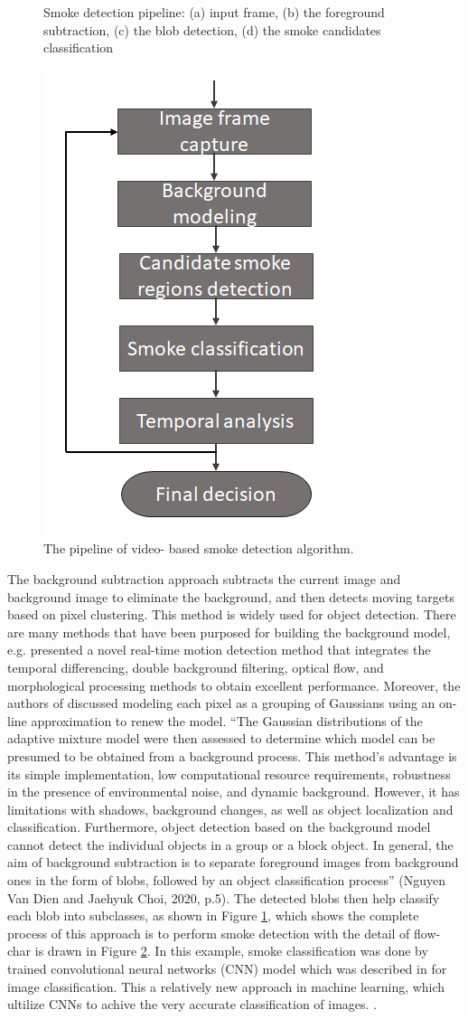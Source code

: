 \begin{figure}
{}
\caption{Smoke detection pipeline: (a) input frame, (b) the foreground subtraction, (c) the blob detection, (d) the smoke candidates classification }
\label{fig:bgmethod}
\end{figure}
\begin{figure}
\centering
 \includegraphics[width=0.3\linewidth]{Figures/smoke.jpg}
 \caption{The pipeline of video- based smoke detection algorithm.}
 \label{fig:smoke}
\end{figure}
The background subtraction approach \cite{lee2012adaptive}\cite{stauffer1999adaptive} subtracts the current image and background image to eliminate the background, and then detects moving targets based on pixel clustering. This method is widely used for object detection. There are many methods that have been purposed for building the background model, e.g.  \cite{lu2008improved} presented a novel real-time motion detection method that integrates the temporal differencing, double background filtering, optical flow, and morphological processing methods to obtain excellent performance. Moreover, the authors of \cite{stauffer1999adaptive} discussed modeling each pixel as a grouping of Gaussians using an on-line approximation to renew the model. “The Gaussian distributions of the adaptive mixture model were then assessed to determine which model can be presumed to be obtained from a background process. This method’s advantage is its simple implementation, low computational resource requirements, robustness in the presence of environmental noise, and dynamic background. However, it has limitations with shadows, background changes, as well as object localization and classification. Furthermore, object detection based on the background model cannot detect the individual objects in a group or a block object. In general, the aim of background subtraction is to separate foreground images from background ones in the form of blobs, followed by an object classification process” (Nguyen Van Dien and Jaehyuk Choi, 2020, p.5). The detected blobs then help classify each blob into subclasses, as shown in Figure \ref{fig:bgmethod}, which shows the complete process of this approach is to perform smoke detection with the detail of flow-char is drawn in Figure \ref{fig:smoke}. In this example, smoke classification was done by trained convolutional neural networks (CNN) model which was described in \cite{krizhevsky2017imagenet} for image classification. This a relatively new approach in machine learning, which ultilize CNNs to achive the very accurate classification of images. \cite{lecun2010convolutional}\cite{jarrett2009best}\cite{lee2009convolutional}. 
